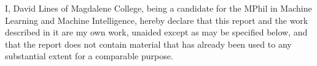
\begin{declaration}

I, David Lines of Magdalene College, being a candidate for the MPhil in Machine Learning and Machine Intelligence, hereby declare that this report and the work described in it are my own work, unaided except as may be specified below, and that the report does not contain material that has already been used to any substantial extent for a comparable purpose.


\end{declaration}

